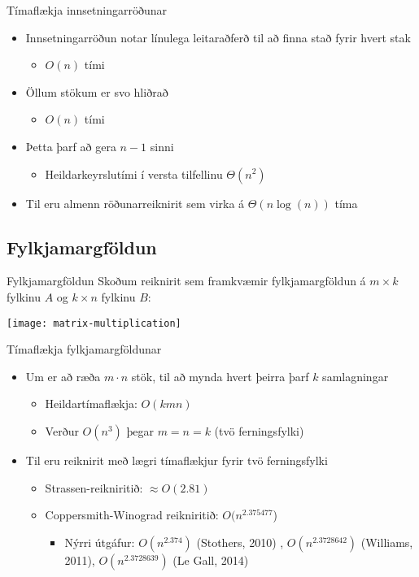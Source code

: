 \documentclass[handout]{beamer}
\begin{document}
\begin{frame}{Tímaflækja innsetningarröðunar}
\begin{itemize}
 \item Innsetningarröðun notar línulega leitaraðferð til að finna stað fyrir hvert stak \pause
 \begin{itemize}
  \item $O(n)$ tími
 \end{itemize}
 \item Öllum stökum er svo hliðrað \pause
 \begin{itemize}
  \item $O(n)$ tími
 \end{itemize}
 \item Þetta þarf að gera $n-1$ sinni
 \begin{itemize}
  \item Heildarkeyrslutími í versta tilfellinu $\Theta(n^2)$
 \end{itemize}
 \item Til eru almenn röðunarreiknirit sem virka á $\Theta(n\log(n))$ tíma
\end{itemize}
\end{frame}

\subsection{Fylkjamargföldun}

\begin{frame}{Fylkjamargföldun}
Skoðum reiknirit sem framkvæmir fylkjamargföldun á $m \times k$ fylkinu $A$ og $k \times n$ fylkinu $B$:
\begin{center}
\texttt{[image: matrix-multiplication]}
\end{center}
\end{frame}

\begin{frame}{Tímaflækja fylkjamargföldunar}
\begin{itemize}
 \item Um er að ræða $m \cdot n$ stök, til að mynda hvert þeirra þarf $k$ samlagningar \pause
 \begin{itemize}
  \item Heildartímaflækja: $O(kmn)$
  \item Verður $O(n^3)$ þegar $m = n = k$ (tvö ferningsfylki)
 \end{itemize}
 \item Til eru reiknirit með lægri tímaflækjur fyrir tvö ferningsfylki
 \begin{itemize}
  \item Strassen-reikniritið: $\approx O(2.81)$
  \item Coppersmith-Winograd reikniritið: $O(n^{2.375477}$)
  \begin{itemize}
   \item Nýrri útgáfur: $O(n^{2.374})$ (Stothers, 2010) \pause, $O(n^{2.3728642})$ (Williams, 2011), \pause $O(n^{2.3728639})$ (Le Gall, 2014)
  \end{itemize}
 \end{itemize}
\end{itemize}
\end{frame}
\end{document}
